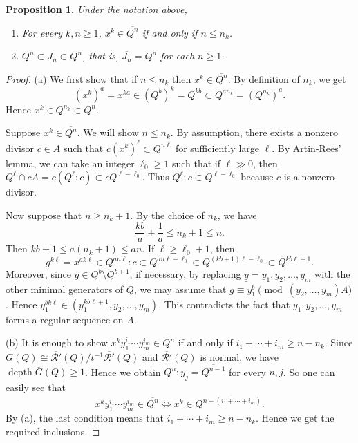 \documentclass[12pt]{amsart}
\newtheorem{prop}[thm]{Proposition}
\theoremstyle{definition}
\theoremstyle{remark}
\numberwithin{equation}{section}
\DeclareMathOperator{\depth}{depth}
\begin{document}
\begin{prop} \label{JN}
Under the notation above, 
\begin{enumerate}
\item[\rm{(a)}] For every $k,n \ge 1$, $x^k \in \overline{Q^n}$ 
if and only if $n \le n_k$. 
\item[\rm{(b)}] 
$Q^n \subset J_n \subset \overline{Q^n}$, that is, 
$\overline{J_n}=\overline{Q^n}$ for each $n \ge 1$. 
\end{enumerate}
\end{prop}

\begin{proof}
(a) We first show that if $n \le n_k$ then $x^k \in \overline{Q^n}$. 
By definition of $n_k$, we get 
\[
(x^k)^a=x^{ka} \in (Q^b)^k =Q^{kb} \subset Q^{an_k}=(Q^{n_k})^a.  
\]
Hence $x^k \in \overline{Q^{n_k}} \subset \overline{Q^{n}}$. 
\par \vspace{2mm}
Suppose $x^k \in \overline{Q^{n}}$. 
We will show $n \le n_k$. 
By assumption, there exists a nonzero divisor $c \in A$ such that 
$c(x^k)^{\ell} \subset Q^{n\ell}$ for sufficiently large $\ell$. 
By Artin-Rees' lemma, we can take an integer $\ell_0 \ge 1$ such that 
if $\ell \gg 0$, then $Q^{\ell} \cap cA =c(Q^{\ell} \colon c) \subset cQ^{\ell-\ell_0}$. 
Thus $Q^{\ell} \colon c \subset Q^{\ell-\ell_0}$ 
because $c$ is a  nonzero divisor.
\par 
Now suppose that $n \ge n_k+1$. 
By the choice of $n_k$, we have 
\[
\frac{kb}{a}+\frac{1}{a} \le n_k+1 \le n.
\]
Then $kb+1 \le a(n_k+1) \le an$. 
If $\ell \ge \ell_0+1$, then 
\[
g^{k\ell} =x^{ak\ell} \in Q^{an\ell}\colon c \subset Q^{an\ell-\ell_0}
\subset Q^{(kb+1)\ell-\ell_0}
\subset Q^{kb\ell+1}. 
\]
Moreover, since $g \in Q^b \setminus Q^{b+1}$, if necessary, by replacing $\underline{y}=y_1,y_2,\ldots,y_m$ 
with the other minimal generators of $Q$, 
we may assume that $g \equiv y_1^{b} \pmod{(y_2,\ldots,y_m)A}$.  
Hence $y_1^{bk\ell} \in (y_1^{kb\ell+1},y_2,\ldots, y_m)$. 
This contradicts the fact that $y_1,y_2,\ldots,y_m$ forms a regular sequence on $A$. 
\par \vspace{2mm} %
(b)
It is enough to show 
$x^ky_1^{i_1}\cdots y_m^{i_m} \in \overline{Q^n}$ 
if and only if $i_1+\cdots+i_m \ge n-n_k$. 
Since $\overline{G}(Q) \cong \overline{\mathcal{R}'}(Q)/t^{-1}\overline{\mathcal{R}'}(Q)$ and 
$\overline{\mathcal{R}'}(Q)$ is normal, we have $\depth \overline{G}(Q) \ge 1$. 
Hence we obtain $\overline{Q^n} \colon y_j = \overline{Q^{n-1}}$ for every $n,j$. 
So one can easily see that 
\[
x^ky_1^{i_1}\cdots y_m^{i_m} \in \overline{Q^n} \Longleftrightarrow 
x^k \in \overline{Q^{n-(i_1+\cdots+i_m)}}. 
\]
By (a), the last condition means that 
$i_1+ \cdots +i_m \ge n-n_k$.  Hence we get the required inclusions. 
\end{proof}
\end{document}

